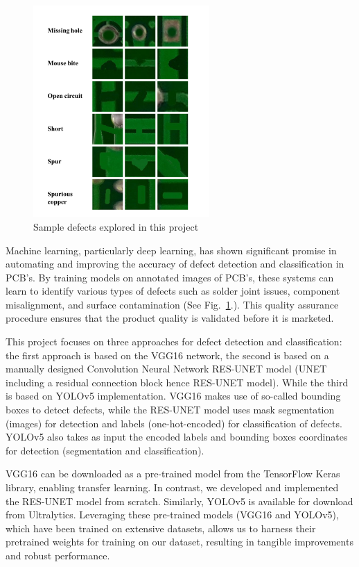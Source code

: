 \documentclass[12pt]{article}
\begin{document}
\begin{figure}[h]
    \centering
    \includegraphics[width=0.6\textwidth]{./graphics/Defects.png}
    \caption{Sample defects explored in this project}
    \label{fig:defects}
\end{figure}

Machine learning, particularly deep learning, has shown significant promise in automating and improving the accuracy of defect detection and classification in PCB's. By training models on annotated images of PCB's, these systems can learn to identify various types of defects such as solder joint issues, component misalignment, and surface contamination (See Fig.~\ref{fig:defects}.). This quality assurance procedure ensures that the product quality is validated before it is marketed.

This project focuses on three approaches for defect detection and classification: the first approach is based on the VGG16 network, the second is based on a manually designed Convolution Neural Network RES-UNET model (UNET including a residual connection block hence RES-UNET model). While the third is based on YOLOv5 implementation. 
VGG16 makes use of so-called bounding boxes to detect defects, while the RES-UNET model uses mask segmentation (images) for detection and labels (one-hot-encoded) for classification of defects. YOLOv5 also takes as input the encoded labels and bounding boxes coordinates for detection (segmentation and classification).

VGG16 can be downloaded as a pre-trained model from the TensorFlow Keras library, enabling transfer learning. In contrast, we developed and implemented the RES-UNET model from scratch. Similarly, YOLOv5 is available for download from Ultralytics. Leveraging these pre-trained models (VGG16 and YOLOv5), which have been trained on extensive datasets, allows us to harness their pretrained weights for training on our dataset, resulting in tangible improvements and robust performance.
\end{document}
